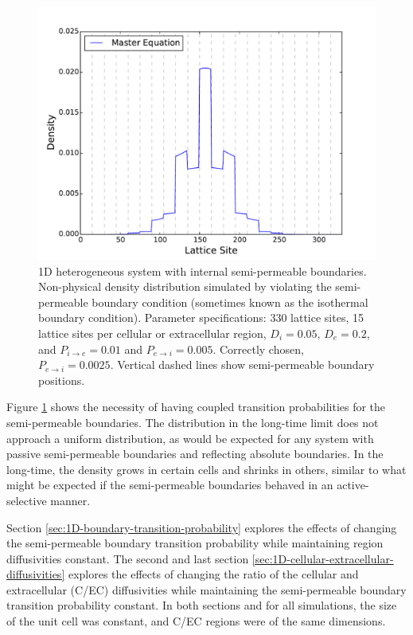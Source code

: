 	\begin{figure}[h]
		\centering
		\includegraphics[width=1.0\linewidth]{../images/1D/11U_heterogeneous_plots_1D_nonphysical}
		\caption{1D heterogeneous system with internal semi-permeable boundaries. Non-physical density distribution simulated by violating the semi-permeable boundary condition (sometimes known as the isothermal boundary condition). Parameter specifications: 330 lattice sites, 15 lattice sites per cellular or extracellular region, $ D_i = 0.05 $, $ D_e = 0.2 $, and $ P_{i\rightarrow e} = 0.01 $ and $ P_{e\rightarrow i} =  0.005 $. Correctly chosen, $ P_{e\rightarrow i} =  0.0025 $. Vertical dashed lines show semi-permeable boundary positions. }
		\label{fig:11U_heterogeneous_plots_1D_nonphysical}
	\end{figure}
	
	\newpage
	Figure \ref{fig:11U_heterogeneous_plots_1D_nonphysical} shows the necessity of having coupled transition probabilities for the semi-permeable boundaries. The distribution in the long-time limit does not approach a uniform distribution, as would be expected for any system with passive semi-permeable boundaries and reflecting absolute boundaries. In the long-time, the density grows in certain cells and shrinks in others, similar to what might be expected if the semi-permeable boundaries behaved in an active-selective manner. 
	
	\newpage
	Section \ref{sec:1D-boundary-transition-probability} explores the effects of changing the semi-permeable boundary transition probability while maintaining region diffusivities constant. The second and last section \ref{sec:1D-cellular-extracellular-diffusivities} explores the effects of changing the ratio of the cellular and extracellular (C/EC) diffusivities while maintaining the semi-permeable boundary transition probability constant. In both sections and for all simulations, the size of the unit cell was constant, and C/EC regions were of the same dimensions.
	
